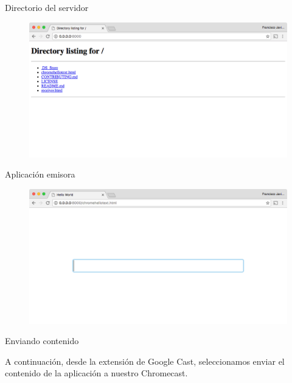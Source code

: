 \begin{frame}{Directorio del servidor}
	\begin{figure}[H]
		\centering
		\includegraphics[width=1.05\textwidth]{./Imagenes/directorylisting.png}
	\end{figure}
\end{frame}



\begin{frame}{Aplicación emisora}
	\begin{figure}[H]
		\centering
		\includegraphics[width=1.05\textwidth]{./Imagenes/emisor1.png}
	\end{figure}
\end{frame}



\begin{frame}{Enviando contenido}
	\begin{block}{ }
		A continuación, desde la extensión de Google Cast, seleccionamos enviar el contenido de la aplicación a nuestro Chromecast.
	\end{block}
\end{frame}



